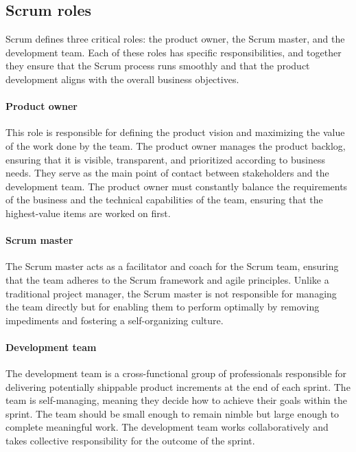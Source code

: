 \subsection{Scrum roles}

Scrum defines three critical roles: the product owner, the Scrum master, and the
development team.
Each of these roles has specific responsibilities, and together they ensure that the Scrum
process runs smoothly and that the product development aligns with the overall business
objectives.

\paragraph{Product owner} This role is responsible for defining the product vision and
    maximizing the value of the work done by the team. The product owner manages the
    product backlog, ensuring that it is visible, transparent, and prioritized according
    to business needs. They serve as the main point of contact between stakeholders and
    the development team\nocite{openagile2019roles}. The product owner must constantly
    balance the requirements of the business and the technical capabilities of the team,
    ensuring that the highest-value items are worked on first.

\paragraph{Scrum master} The Scrum master acts as a facilitator and coach for the Scrum team,
    ensuring that the team adheres to the Scrum framework and agile principles. Unlike a
    traditional project manager, the Scrum master is not responsible for managing the team
    directly but for enabling them to perform optimally by removing impediments and
    fostering a self-organizing culture\nocite{cobb2015scrum}.

\paragraph{Development team} The development team is a cross-functional group of professionals
    responsible for delivering potentially shippable product increments at the end of each
    sprint. The team is self-managing, meaning they decide how to achieve their goals
    within the sprint. The team should be small enough to remain nimble but large enough
    to complete meaningful work\nocite{rubin2012sprints}. The development team works
    collaboratively and takes collective responsibility for the outcome of the sprint.

